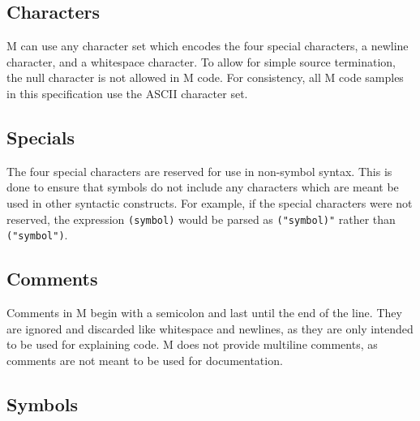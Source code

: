 \documentclass{article}
\begin{document}
    \begin{multicols}{2}
        \subsection{Characters}\label{subsec:characters}

        \begin{minipage}{\columnwidth}
            M can use any character set which encodes the four special characters, a newline character, and a whitespace character.
            To allow for simple source termination, the null character is not allowed in M code.
            For consistency, all M code samples in this specification use the ASCII character set.
        \end{minipage}

        \subsection{Specials}\label{subsec:specials}

        \begin{minipage}{\columnwidth}
            The four special characters are reserved for use in non-symbol syntax.
            This is done to ensure that symbols do not include any characters which are meant be used in other syntactic constructs.
            For example, if the special characters were not reserved, the expression \texttt{(symbol)} would be parsed as \texttt{("symbol)"} rather than \texttt{("symbol")}.
        \end{minipage}

        \subsection{Comments}\label{subsec:comments}

        \begin{minipage}{\columnwidth}
            Comments in M begin with a semicolon and last until the end of the line.
            They are ignored and discarded like whitespace and newlines, as they are only intended to be used for explaining code.
            M does not provide multiline comments, as comments are not meant to be used for documentation.
        \end{minipage}

        \subsection{Symbols}\label{subsec:symbols}


\end{multicols}
\end{document}
